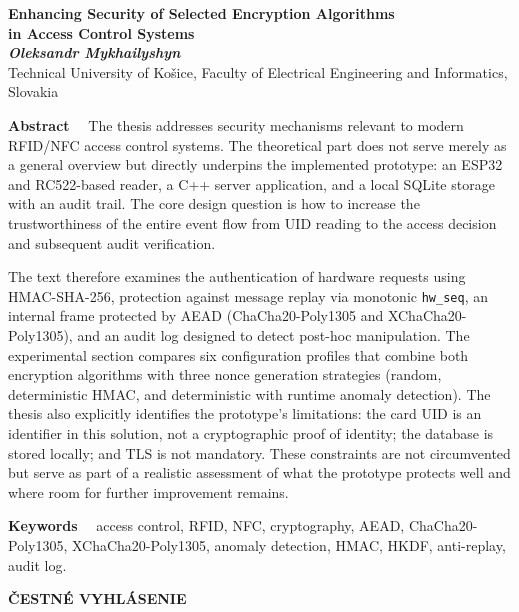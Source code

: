 \documentclass[journal,a4paper,onecolumn]{IEEEtran}
\begin{document}
\clearpage
\begin{center}
  {\large\textbf{Enhancing Security of Selected Encryption Algorithms\\[0.2em]in Access Control Systems}}\\[0.8em]
  \textit{\textbf{Oleksandr Mykhailyshyn}}\\[0.3em]
  Technical University of Ko\v{s}ice, Faculty of Electrical Engineering and Informatics, Slovakia
\end{center}

\bigskip
\noindent\textbf{Abstract}~\textendash~
The thesis addresses security mechanisms relevant to modern RFID/NFC access control systems.
The theoretical part does not serve merely as a general overview but directly underpins the
implemented prototype: an ESP32 and RC522-based reader, a C++ server application, and a local
SQLite storage with an audit trail. The core design question is how to increase the
trustworthiness of the entire event flow from UID reading to the access decision and subsequent
audit verification.

\medskip
\noindent
The text therefore examines the authentication of hardware requests using HMAC-SHA-256,
protection against message replay via monotonic \texttt{hw\_seq}, an internal frame protected by
AEAD (ChaCha20-Poly1305 and XChaCha20-Poly1305), and an audit log designed to detect post-hoc
manipulation. The experimental section compares six configuration profiles that combine both
encryption algorithms with three nonce generation strategies (random, deterministic HMAC, and
deterministic with runtime anomaly detection). The thesis also explicitly identifies the
prototype's limitations: the card UID is an identifier in this solution, not a cryptographic
proof of identity; the database is stored locally; and TLS is not mandatory. These constraints
are not circumvented but serve as part of a realistic assessment of what the prototype protects
well and where room for further improvement remains.

\bigskip
\noindent\textbf{Keywords}~\textendash~
access control, RFID, NFC, cryptography, AEAD, ChaCha20-Poly1305, XChaCha20-Poly1305,
anomaly detection, HMAC, HKDF, anti-replay, audit log.

\clearpage
\vspace*{4cm}
\begin{center}
  {\Large\textbf{ČESTNÉ VYHLÁSENIE}}
\end{center}
\end{document}
